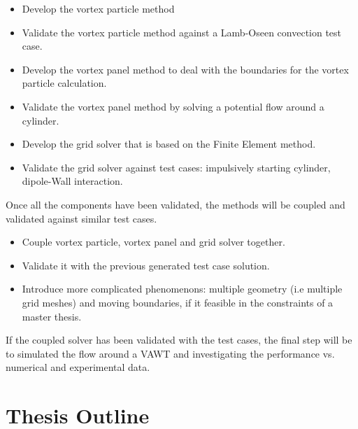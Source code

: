 	\begin{itemize}
	\item Develop the vortex particle method
	\item Validate the vortex particle method against a Lamb-Oseen convection test case.
	\item Develop the vortex panel method to deal with the boundaries for the vortex particle calculation. 
	\item Validate the vortex panel method by solving a potential flow around a cylinder.
	\item Develop the grid solver that is based on the Finite Element method. 
	\item Validate the grid solver against test cases: impulsively starting cylinder, dipole-Wall interaction.
	\end{itemize}

Once all the components have been validated, the methods will be coupled and validated against similar test cases.

	\begin{itemize}
	\item Couple vortex particle, vortex panel and grid solver together.
	\item Validate it with the previous generated test case solution.
	\item Introduce more complicated phenomenons: multiple geometry (i.e multiple grid meshes) and moving boundaries, if it feasible in the constraints of a master thesis.
	\end{itemize}

If the coupled solver has been validated with the test cases, the final step will be to simulated the flow around a VAWT and investigating the performance vs. numerical and experimental data.


\section{Thesis Outline}


%
%
%
%

